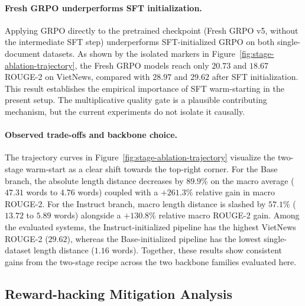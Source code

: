 \documentclass[11pt]{article}
\begin{document}
\paragraph{Fresh GRPO underperforms SFT initialization.}
Applying GRPO directly to the pretrained checkpoint (Fresh GRPO v5, without the intermediate SFT step) underperforms SFT-initialized GRPO on both single-document datasets.
As shown by the isolated markers in Figure~\ref{fig:stage-ablation-trajectory}, the Fresh GRPO models reach only $20.73$ and $18.67$ ROUGE-2 on VietNews, compared with $28.97$ and $29.62$ after SFT initialization.
This result establishes the empirical importance of SFT warm-starting in the present setup. The multiplicative quality gate is a plausible contributing mechanism, but the current experiments do not isolate it causally.

\paragraph{Observed trade-offs and backbone choice.}
The trajectory curves in Figure~\ref{fig:stage-ablation-trajectory} visualize the two-stage warm-start as a clear shift towards the top-right corner.
For the Base branch, the absolute length distance decreases by $89.9\%$ on the macro average ($47.31$ words to $4.76$ words) coupled with a $+261.3\%$ relative gain in macro ROUGE-2.
For the Instruct branch, macro length distance is slashed by $57.1\%$ ($13.72$ to $5.89$ words) alongside a $+130.8\%$ relative macro ROUGE-2 gain.
Among the evaluated systems, the Instruct-initialized pipeline has the highest VietNews ROUGE-2 ($29.62$), whereas the Base-initialized pipeline has the lowest single-dataset length distance ($1.16$ words).
Together, these results show consistent gains from the two-stage recipe across the two backbone families evaluated here.

\subsection{Reward-hacking Mitigation Analysis}
\end{document}
